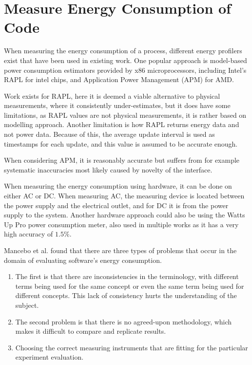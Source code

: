 
\section{Measure Energy Consumption of Code}

When measuring the energy consumption of a process, different energy profilers exist that have been used in existing work. One popular approach is model-based power consumption estimators provided by x86 microprocessors, including Intel's RAPL for intel chips, and Application Power Management (APM) for AMD.

Work exists for RAPL, here it is deemed a viable alternative to physical measurements, where it consistently under-estimates\cite[]{Dongarra2012, Hackenberg2013}, but it does have some limitations, as RAPL values are not physical measurements, it is rather based on modelling approach\cite[]{Hackenberg2013}. Another limitation is how RAPL returns energy data and not power data. Because of this, the average update interval is used as timestamps for each update, and this value is assumed to be accurate enough.\cite[]{Hackenberg2013}

When considering APM, it is reasonably accurate but suffers from for example systematic inaccuracies most likely caused by novelty of the interface.\cite[]{Hackenberg2013}


When measuring the energy consumption using hardware, it can be done on either AC or DC. When measuring AC, the measuring device is located between the power supply and the electrical outlet, and for DC it is from the power supply to the system.\cite[]{Hackenberg2013} Another hardware approach could also be using the Watts Up Pro power consumption meter, also used in multiple works as it has a very high accuracy of $1.5\%$.\cite[]{Jagroep2015}\nytafsnit





Mancebo et al. found that there are three types of problems that occur in the domain of evaluating software's energy consumption.\cite{MANCEBO2021100558} 
\begin{enumerate}
    \item The first is that there are inconsistencies in the terminology, with different terms being used for the same concept or even the same term being used for different concepts. This lack of consistency hurts the understanding of the subject.
    \item The second problem is that there is no agreed-upon methodology, which makes it difficult to compare and replicate results.
    \item Choosing the correct measuring instruments that are fitting for the particular experiment evaluation.
\end{enumerate}

